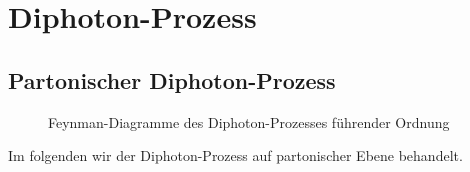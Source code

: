 \chapter{Diphoton-Prozess}
\label{2}
\section{Partonischer Diphoton-Prozess}
\begin{figure}
	\caption{Feynman-Diagramme des Diphoton-Prozesses führender Ordnung}
\end{figure}
Im folgenden wir der Diphoton-Prozess auf partonischer Ebene behandelt.

